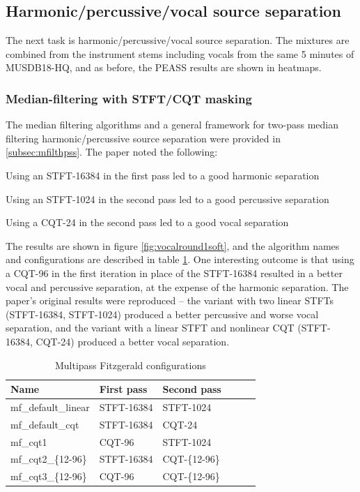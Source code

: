 \documentclass[letter,12pt]{article}
\newenvironment{tight_enumerate}{
\begin{enumerate}
  \setlength{\itemsep}{0pt}
  \setlength{\parskip}{0pt}
}{\end{enumerate}}
\begin{document}
\subsection{Harmonic/percussive/vocal source separation}
\label{subsec:mfvocalsep}

The next task is harmonic/percussive/vocal source separation. The mixtures are combined from the instrument stems including vocals from the same 5 minutes of MUSDB18-HQ, and as before, the PEASS results are shown in heatmaps.

\subsubsection{Median-filtering with STFT/CQT masking}

The median filtering algorithms and a general framework for two-pass median filtering harmonic/percussive source separation were provided in \ref{subsec:mfilthpss}. The paper \cite{fitzgerald2} noted the following:
\begin{tight_enumerate}
	\item
		Using an STFT-16384 in the first pass led to a good harmonic separation
	\item
		Using an STFT-1024 in the second pass led to a good percussive separation
	\item
		Using a CQT-24 in the second pass led to a good vocal separation
\end{tight_enumerate}

The results are shown in figure \ref{fig:vocalround1soft}, and the algorithm names and configurations are described in table \ref{table:round3softvocal}. One interesting outcome is that using a CQT-96 in the first iteration in place of the STFT-16384 resulted in a better vocal and percussive separation, at the expense of the harmonic separation. The paper's original results were reproduced -- the variant with two linear STFTs (STFT-16384, STFT-1024) produced a better percussive and worse vocal separation, and the variant with a linear STFT and nonlinear CQT (STFT-16384, CQT-24) produced a better vocal separation.

\begin{table}[ht]
	\centering
\begin{tabular}{ |l|l|l| |c|c|c| }
	 \hline
	  Name & First pass & Second pass  \\
	 \hline
	 \hline
	 mf\_default\_linear & STFT-16384 & STFT-1024 \\
	 \hline
	 mf\_default\_cqt & STFT-16384 & CQT-24 \\
	 \hline
	 mf\_cqt1 & CQT-96 & STFT-1024 \\
	 \hline
	 mf\_cqt2\_\{12-96\} & STFT-16384 & CQT-\{12-96\} \\
	 \hline
	 mf\_cqt3\_\{12-96\} & CQT-96 & CQT-\{12-96\} \\
	 \hline
\end{tabular}
	\caption{Multipass Fitzgerald configurations}
	\label{table:round3softvocal}
\end{table}
\end{document}
